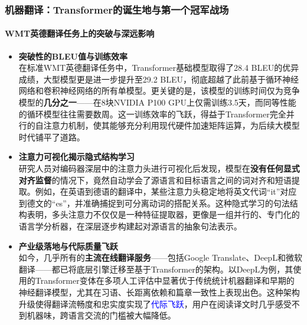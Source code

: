 \documentclass[11pt]{beamer}
\begin{document}
\begin{frame}
\frametitle{机器翻译：Transformer的诞生地与第一个冠军战场}
\framesubtitle{WMT英德翻译任务上的突破与深远影响}

\begin{itemize}
    \item \textbf{突破性的BLEU值与训练效率} \\
    在标准WMT英德翻译任务中，Transformer基础模型取得了\alert{28.4 BLEU}的优异成绩，大型模型更是进一步提升至\alert{29.2 BLEU}，彻底超越了此前基于循环神经网络和卷积神经网络的所有单模型。更关键的是，该模型的训练时间仅为竞争模型的\textbf{几分之一}——在8块NVIDIA P100 GPU上仅需训练3.5天，而同等性能的循环模型往往需要数周。这一训练效率的飞跃，得益于Transformer完全并行的自注意力机制，使其能够充分利用现代硬件加速矩阵运算，为后续大模型时代铺平了道路。

    \item \textbf{注意力可视化揭示隐式结构学习} \\
    研究人员对编码器深层中的注意力头进行可视化后发现，模型在\textbf{没有任何显式对齐监督}的情况下，竟然自动学会了源语言和目标语言之间的词对齐和短语提取。例如，在英语到德语的翻译中，某些注意力头稳定地将英文代词“it”对应到德文的“es”，并准确捕捉到可分离动词的搭配关系。这种隐式学习的句法结构表明，多头注意力不仅仅是一种特征提取器，更像是一组并行的、专门化的语言学分析器，在深层逐步构建起对源语言的抽象句法表示。

    \item \textbf{产业级落地与代际质量飞跃} \\
    如今，几乎所有的\textbf{主流在线翻译服务}——包括Google Translate、DeepL和微软翻译——都已将底层引擎迁移至基于Transformer的架构。以DeepL为例，其使用的Transformer变体在多项人工评估中显著优于传统统计机器翻译和早期的神经翻译模型，尤其在习语、长距离依赖和篇章一致性上表现出色。这种架构升级使得翻译流畅度和忠实度实现了\textcolor{blue}{代际飞跃}，用户在阅读译文时几乎感受不到机器味，跨语言交流的门槛被大幅降低。
\end{itemize}
\end{frame}
\end{document}
